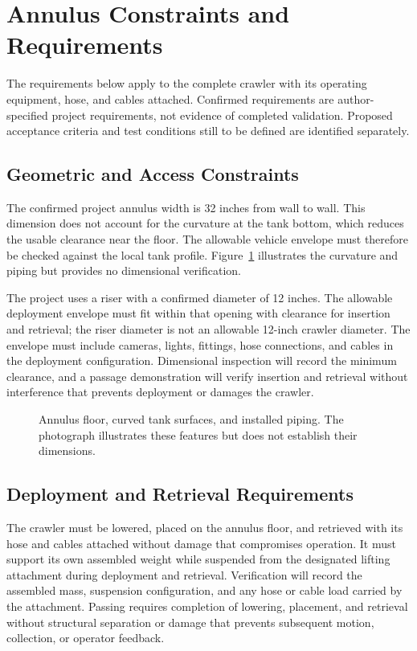\section{Annulus Constraints and Requirements}
\label{sec:dst-constraints}
\begingroup
\renewcommand{\thesubsection}{\thesection.\arabic{subsection}}

The requirements below apply to the complete crawler with its operating equipment, hose, and cables attached. Confirmed requirements are author-specified project requirements, not evidence of completed validation. Proposed acceptance criteria and test conditions still to be defined are identified separately.

\subsection{Geometric and Access Constraints}
\label{sec:annulus-geometry}
The confirmed project annulus width is 32 inches from wall to wall. This dimension does not account for the curvature at the tank bottom, which reduces the usable clearance near the floor. The allowable vehicle envelope must therefore be checked against the local tank profile. Figure~\ref{fig:annulus-clearance} illustrates the curvature and piping but provides no dimensional verification.

The project uses a riser with a confirmed diameter of 12 inches. The allowable deployment envelope must fit within that opening with clearance for insertion and retrieval; the riser diameter is not an allowable 12-inch crawler diameter. The envelope must include cameras, lights, fittings, hose connections, and cables in the deployment configuration. Dimensional inspection will record the minimum clearance, and a passage demonstration will verify insertion and retrieval without interference that prevents deployment or damages the crawler.

\begin{figure}[H]
\centering
{}
\caption{Annulus floor, curved tank surfaces, and installed piping. The photograph illustrates these features but does not establish their dimensions.}
\label{fig:annulus-clearance}
\end{figure}

\subsection{Deployment and Retrieval Requirements}
\label{sec:deployment-requirements}
The crawler must be lowered, placed on the annulus floor, and retrieved with its hose and cables attached without damage that compromises operation. It must support its own assembled weight while suspended from the designated lifting attachment during deployment and retrieval. Verification will record the assembled mass, suspension configuration, and any hose or cable load carried by the attachment. Passing requires completion of lowering, placement, and retrieval without structural separation or damage that prevents subsequent motion, collection, or operator feedback.

